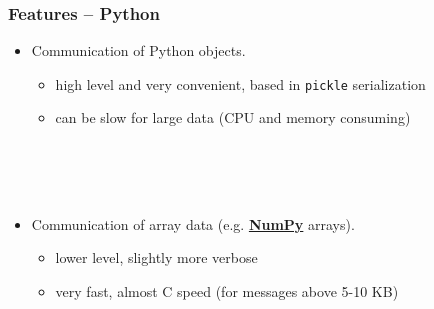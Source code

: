 \begin{frame}
  \frametitle{Features -- Python}
  \begin{itemize}
  \item Communication of Python objects.
    \begin{itemize}
    \item high level and very convenient, based in \texttt{pickle}
      serialization
    \item can be slow for large data (CPU and memory consuming)
    \end{itemize}
    \\
    \\\hspace{39ex}\\
  \item Communication of array data
    (e.g. \href{http://numpy.scipy.org}{\textbf{NumPy}} arrays).
    \begin{itemize}
    \item lower level, slightly more verbose
    \item very fast, almost C speed (for messages above 5-10 KB)
    \end{itemize}
  \end{itemize}
\end{frame}

